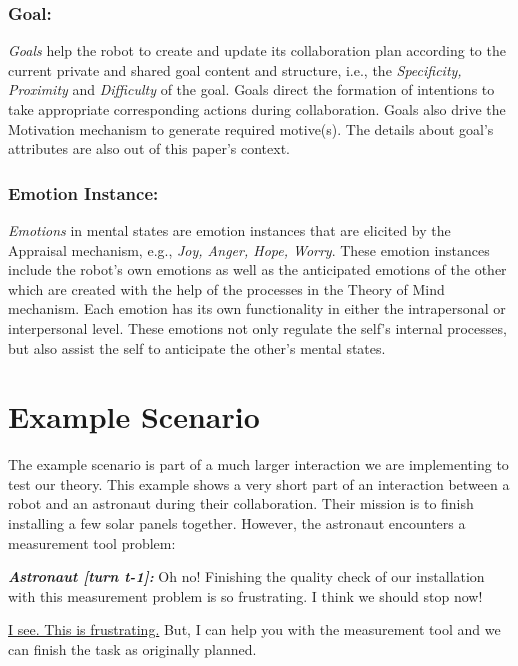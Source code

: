 \documentclass{aamas2016}
\begin{document}
\vspace*{-2mm}
\subsubsection{Goal:}

\textit{Goals} help the robot to create and update its collaboration plan
according to the current private and shared goal content and structure, i.e.,
the \textit{Specificity, Proximity} and \textit{Difficulty} of the goal. Goals
direct the formation of intentions to take appropriate corresponding actions
during collaboration. Goals also drive the Motivation mechanism to generate
required motive(s). The details about goal's attributes are also out of this
paper's context.

\vspace*{-1mm}
\subsubsection{Emotion Instance:}

\textit{Emotions} in mental states are emotion instances that are elicited by
the Appraisal mechanism, e.g., \textit{Joy, Anger, Hope, Worry}. These emotion
instances include the robot's own emotions as well as the anticipated emotions
of the other which are created with the help of the processes in the Theory of
Mind mechanism. Each emotion has its own functionality in either the
intrapersonal or interpersonal level. These emotions not only regulate the
self's internal processes, but also assist the self to anticipate the other's
mental states.

\section{Example Scenario}

The example scenario is part of a much larger interaction we are implementing to
test our theory. This example shows a very short part of an interaction between
a robot and an astronaut during their collaboration. Their mission is to finish
installing a few solar panels together. However, the astronaut encounters a
measurement tool problem:

\vspace*{-1mm}
\begin{description}
  \item \textit{\textbf{\fontsize{9pt}{12pt}\selectfont Astronaut [turn t-1]:}}
  Oh no! Finishing the quality check of our installation with this measurement
  problem is so frustrating. I think we should stop now!

  \item \textit{\textbf{\fontsize{9pt}{12pt}\selectfont{Robot [turn t]:}}}
  \underline{I see. This is frustrating.} But, I can help you with the
  measurement tool and we can finish the task as originally planned.
\end{description}
\end{document}
